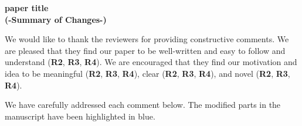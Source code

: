\documentclass[11pt]{article}
\newcounter{reviewer}
\begin{document}
\begin{center}
	\LARGE{
\textbf{paper title\\ 
(-Summary of Changes-)}
}
\end{center}

We would like to thank the reviewers for providing constructive comments. 
We are pleased that they find our paper to be well-written and easy to follow and understand (\textbf{R2}, \textbf{R3}, \textbf{R4}). 
We are encouraged that they find our motivation and idea to be meaningful (\textbf{R2}, \textbf{R3}, \textbf{R4}), clear (\textbf{R2}, \textbf{R3}, \textbf{R4}), and novel (\textbf{R2}, \textbf{R3}, \textbf{R4}).

We have carefully addressed each comment below.
The modified parts in the manuscript have been highlighted in blue.








\end{document}
